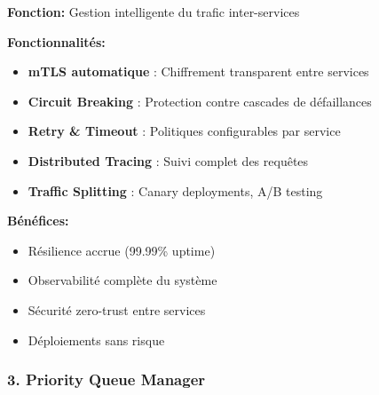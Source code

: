 \documentclass[12pt,a4paper]{article}
\begin{document}
\begin{tcolorbox}[colback=green!5,colframe=green!50!black,title=\textbf{Nouveau Composant: Service Mesh (Istio/Linkerd)}]

\textbf{Fonction:} Gestion intelligente du trafic inter-services

\textbf{Fonctionnalités:}
\begin{itemize}[noitemsep]
    \item \textbf{mTLS automatique} : Chiffrement transparent entre services
    \item \textbf{Circuit Breaking} : Protection contre cascades de défaillances
    \item \textbf{Retry \& Timeout} : Politiques configurables par service
    \item \textbf{Distributed Tracing} : Suivi complet des requêtes
    \item \textbf{Traffic Splitting} : Canary deployments, A/B testing
\end{itemize}

\textbf{Bénéfices:}
\begin{itemize}[noitemsep]
    \item Résilience accrue (99.99\% uptime)
    \item Observabilité complète du système
    \item Sécurité zero-trust entre services
    \item Déploiements sans risque
\end{itemize}
\end{tcolorbox}

\subsubsection{3. Priority Queue Manager}
\end{document}
